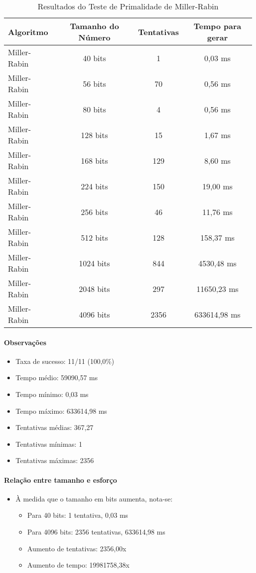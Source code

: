 \begin{table}[H]
\centering
\caption{Resultados do Teste de Primalidade de Miller-Rabin}
\label{tab:miller-rabin}
\begin{tabular}{|l|c|c|c|}
\hline
\textbf{Algoritmo} & \textbf{Tamanho do Número} & \textbf{Tentativas} & \textbf{Tempo para gerar} \\
\hline
Miller-Rabin & 40 bits & 1 & 0,03 ms \\
Miller-Rabin & 56 bits & 70 & 0,56 ms \\
Miller-Rabin & 80 bits & 4 & 0,56 ms \\
Miller-Rabin & 128 bits & 15 & 1,67 ms \\
Miller-Rabin & 168 bits & 129 & 8,60 ms \\
Miller-Rabin & 224 bits & 150 & 19,00 ms \\
Miller-Rabin & 256 bits & 46 & 11,76 ms \\
Miller-Rabin & 512 bits & 128 & 158,37 ms \\
Miller-Rabin & 1024 bits & 844 & 4530,48 ms \\
Miller-Rabin & 2048 bits & 297 & 11650,23 ms \\
Miller-Rabin & 4096 bits & 2356 & 633614,98 ms \\
\hline
\end{tabular}
\end{table}

\paragraph{Observações}
\begin{itemize}
    \item Taxa de sucesso: 11/11 (100,0\%)
    \item Tempo médio: 59090,57 ms
    \item Tempo mínimo: 0,03 ms
    \item Tempo máximo: 633614,98 ms
    \item Tentativas médias: 367,27
    \item Tentativas mínimas: 1
    \item Tentativas máximas: 2356
\end{itemize}

\paragraph{Relação entre tamanho e esforço}
\begin{itemize}
    \item À medida que o tamanho em bits aumenta, nota-se:
    \begin{itemize}
        \item Para 40 bits: 1 tentativa, 0,03 ms
        \item Para 4096 bits: 2356 tentativas, 633614,98 ms
        \item Aumento de tentativas: 2356,00x
        \item Aumento de tempo: 19981758,38x
    \end{itemize}
\end{itemize}

